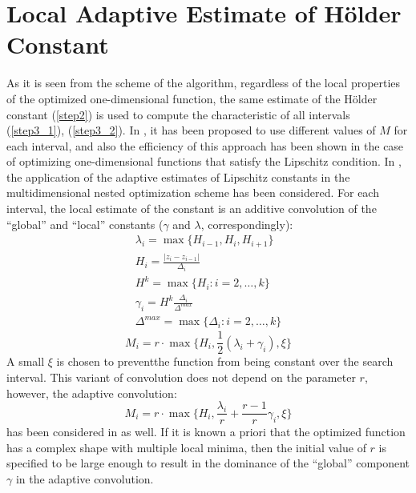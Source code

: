 \documentclass[procedia]{easychair}
\begin{document}
\section{Local Adaptive Estimate of Hölder Constant}
As it is seen from the scheme of the algorithm, regardless of the local properties
of the optimized one-dimensional function, the same estimate of the Hölder
constant (\ref{step2}) is used to compute the characteristic of all intervals (\ref{step3_1}), (\ref{step3_2}).
In \cite{sergLocalTuning}, it has been proposed to use different values of \(M\) for each interval,
and also the efficiency of this approach has been shown in the case of optimizing
one-dimensional functions that satisfy the Lipschitz condition. In \cite{nestedLocal},
the application of the adaptive estimates of Lipschitz constants in the multidimensional
nested optimization scheme has been considered. For each interval, the local estimate of the
constant is an additive convolution of the ``global'' and ``local'' constants
(\(\gamma\) and \(\lambda\), correspondingly):
\begin{displaymath}
  \begin{array}{lr}
    \lambda_i=\max\{H_{i-1},H_i,H_{i+1}\} \\
    H_i=\frac{|z_i-z_{i-1}|}{\Delta_i} \\
    H^k=\max\{H_i:i=2,\dots ,k\} \\
    \gamma_i=H^k\frac{\Delta_i}{\Delta^{max}} \\
    \Delta^{max}=\max\{\Delta_{i}:i=2,\dots ,k\}
  \end{array}
\end{displaymath}
\begin{equation}
\label{additiveConv}
M_i=r\cdot \max\{H_i, \frac{1}{2}(\lambda_i+\gamma_i),\xi\}
\end{equation}
A small \(\xi\) is chosen to preventthe function from being constant over the search interval.
This variant of convolution does not depend on the parameter \(r\), however, the adaptive convolution:
\begin{equation}
\label{additiveAdaptiveConv}
M_i=r\cdot \max\{H_i, \frac{\lambda_i}{r}+\frac{r-1}{r}\gamma_i,\xi\}
\end{equation}
has been considered in \cite{sergLocalTuning} as well.
If it is known a priori that the optimized function has a complex shape with multiple
local minima, then the initial value of \(r\) is specified to be large enough to
result in the dominance of the ``global'' component \(\gamma\) in the adaptive convolution.
\end{document}

